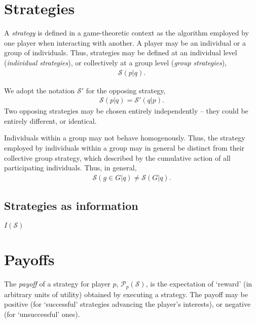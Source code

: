 \documentclass[twocolumn, aps, rmp, amsmath, amssymb, nofootinbib, superscriptaddress, longbibliography, floatfix, table-of-contents, eqsecnum]{revtex4-2}
\begin{document}
\section{Strategies}

A \textit{strategy} is defined in a game-theoretic context as the algorithm employed by one player when interacting with another. A player may be an individual or a group of individuals. Thus, strategies may be defined at an individual level (\textit{individual strategies}), or collectively at a group level (\textit{group strategies}),
\begin{align}
	\mathcal{S}(p|q).	
\end{align}


We adopt the notation $\mathcal{S}'$ for the opposing strategy,
\begin{align}
	\mathcal{S}(p|q) = \mathcal{S}'(q|p).
\end{align}
Two opposing strategies may be chosen entirely independently -- they could be entirely different, or identical.

Individuals within a group may not behave homogenously. Thus, the strategy employed by individuals within a group may in general be distinct from their collective group strategy, which described by the cumulative action of all participating individuals. Thus, in general,
\begin{align}
	\mathcal{S}(g\in G|q)\neq \mathcal{S}(G|q).
\end{align}

\subsection{Strategies as information}

$I(\mathcal{S})$

\section{Payoffs}

The \textit{payoff} of a strategy for player $p$, $\mathcal{P}_p(\mathcal{S})$, is the expectation of `reward' (in arbitrary units of utility) obtained by executing a strategy. The payoff may be positive (for `successful' strategies advancing the player's interests), or negative (for `unsuccessful' ones).
\end{document}
